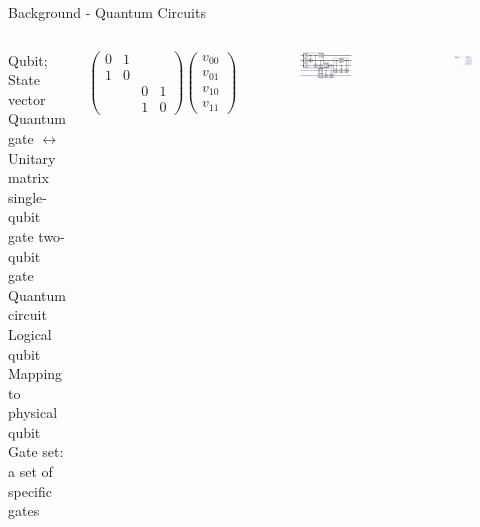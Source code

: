 \documentclass{beamer}
\begin{document}
\begin{frame}{Background - Quantum Circuits}
    \begin{columns}
            \begin{outline}
                \1 Qubit; State vector
                \1 Quantum gate $\leftrightarrow$ Unitary matrix
                    \2 single-qubit gate
                    \2 two-qubit gate
                \1 Quantum circuit
                    \2 Logical qubit
                    \2 Mapping to physical qubit
                \1 Gate set: a set of specific gates
            \end{outline}
            \vspace{1em}
            \begingroup
                \small
                $$
                \left(\begin{array}{llll}
                0 & 1 & & \\
                1 & 0 & & \\
                & & 0 & 1 \\
                & & 1 & 0
                \end{array}\right)\left(\begin{array}{l}
                v_{00} \\
                v_{01} \\
                v_{10} \\
                v_{11}
                \end{array}\right)
                $$
            \endgroup
            \begin{figure}
                \centering
                \includegraphics[scale=0.08]{qc.png}
            \end{figure}
            \begin{figure}
                \centering
                \includegraphics[scale=0.32]{IBM_penguin.jpg}
            \end{figure}
    \end{columns}
\end{frame}
\end{document}
